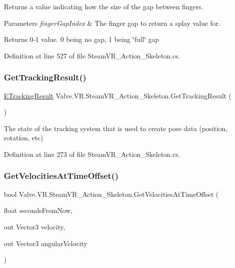 Returns a value indicating how the size of the gap between fingers. 


\begin{DoxyParams}{Parameters}
{\em finger\+Gap\+Index} & The finger gap to return a splay value for.\\
\hline
\end{DoxyParams}
\begin{DoxyReturn}{Returns}
0-\/1 value. 0 being no gap, 1 being \char`\"{}full\char`\"{} gap
\end{DoxyReturn}


Definition at line 527 of file Steam\+V\+R\+\_\+\+Action\+\_\+\+Skeleton.\+cs.

\mbox{\label{class_valve_1_1_v_r_1_1_steam_v_r___action___skeleton_a83b8c17567b588db367895d688f35df4}} 
\subsubsection{\texorpdfstring{GetTrackingResult()}{GetTrackingResult()}}
{\footnotesize\ttfamily \mbox{\hyperlink{namespace_valve_1_1_v_r_abe6feab98f33191b7c27b4292012e90a}{E\+Tracking\+Result}} Valve.\+V\+R.\+Steam\+V\+R\+\_\+\+Action\+\_\+\+Skeleton.\+Get\+Tracking\+Result (\begin{DoxyParamCaption}{ }\end{DoxyParamCaption})}



The state of the tracking system that is used to create pose data (position, rotation, etc) 



Definition at line 273 of file Steam\+V\+R\+\_\+\+Action\+\_\+\+Skeleton.\+cs.

\mbox{\label{class_valve_1_1_v_r_1_1_steam_v_r___action___skeleton_a4b4b4dbafdecf7d2d25ecd4db9b4e1b3}} 
\subsubsection{\texorpdfstring{GetVelocitiesAtTimeOffset()}{GetVelocitiesAtTimeOffset()}}
{\footnotesize\ttfamily bool Valve.\+V\+R.\+Steam\+V\+R\+\_\+\+Action\+\_\+\+Skeleton.\+Get\+Velocities\+At\+Time\+Offset (\begin{DoxyParamCaption}\item[{float}]{seconds\+From\+Now,  }\item[{out Vector3}]{velocity,  }\item[{out Vector3}]{angular\+Velocity }\end{DoxyParamCaption})}



